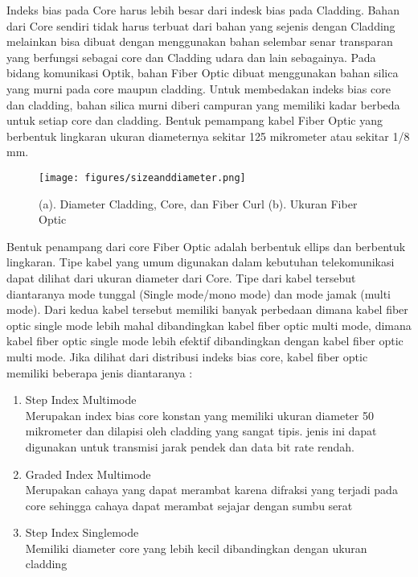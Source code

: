 \begin{flushleft}
Indeks bias pada Core harus lebih besar dari indesk bias pada Cladding. Bahan dari Core sendiri tidak harus terbuat dari bahan yang sejenis dengan Cladding melainkan bisa dibuat dengan menggunakan bahan selembar senar transparan yang berfungsi sebagai core dan Cladding udara dan lain sebagainya. Pada bidang komunikasi Optik, bahan Fiber Optic dibuat menggunakan bahan silica yang murni pada core maupun cladding. Untuk membedakan indeks bias core dan cladding, bahan silica murni diberi campuran yang memiliki kadar berbeda untuk setiap core dan cladding. Bentuk pemampang kabel Fiber Optic yang berbentuk lingkaran ukuran diameternya sekitar 125 mikrometer atau sekitar 1/8 mm.
\begin{figure}[ht]
\centerline{\texttt{[image: figures/sizeanddiameter.png]}}
\caption{(a). Diameter Cladding, Core, dan Fiber Curl  (b). Ukuran Fiber Optic}
\label{Skema Fiber Optic_01}
\end{figure}
\end{flushleft}
\begin{flushleft}
Bentuk penampang dari core Fiber Optic adalah berbentuk ellips dan berbentuk lingkaran. Tipe kabel yang umum digunakan dalam kebutuhan telekomunikasi dapat dilihat dari ukuran diameter dari Core. Tipe dari kabel tersebut diantaranya mode tunggal (Single mode/mono mode) dan mode jamak (multi mode). Dari kedua kabel tersebut memiliki banyak perbedaan dimana kabel fiber optic single mode lebih mahal dibandingkan kabel fiber optic multi mode, dimana kabel fiber optic single mode lebih efektif dibandingkan dengan kabel fiber optic multi mode. Jika dilihat dari distribusi indeks bias core, kabel fiber optic memiliki beberapa jenis diantaranya : 
\begin{enumerate}
\item Step Index Multimode \\ Merupakan index bias core konstan yang memiliki ukuran diameter 50 mikrometer dan dilapisi oleh cladding yang sangat tipis. jenis ini dapat digunakan untuk transmisi jarak pendek dan data bit rate rendah.
\item Graded Index Multimode \\ Merupakan cahaya yang dapat merambat karena difraksi yang terjadi pada core sehingga cahaya dapat merambat sejajar dengan sumbu serat
\item Step Index Singlemode \\ Memiliki diameter core yang lebih kecil dibandingkan dengan ukuran cladding
\end{enumerate}
\end{flushleft}
